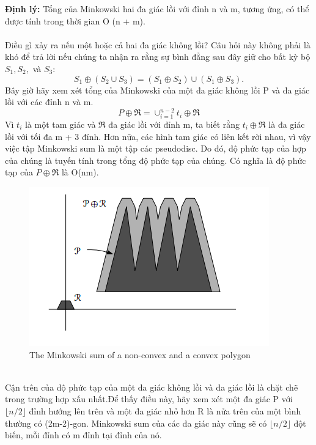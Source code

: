 \documentclass[a4paper,12pt]{report}
\begin{document}
\textbf{Định lý:} Tổng của Minkowski hai đa giác lồi với đỉnh n và m, tương ứng, có thể được tính trong thời gian O (n + m). \\ \\
Điều gì xảy ra nếu một hoặc cả hai đa giác không lồi? Câu hỏi này không phải là khó để trả lời nếu chúng ta nhận ra rằng sự bình đẳng sau đây giữ cho bất kỳ bộ $S_1, S_2,$ và $S_3$:
\begin{displaymath}
S_1 \oplus (S_2 \cup S_3) = (S_1 \oplus S_2) \cup (S_1 \oplus S_3).
\end{displaymath}
Bây giờ hãy xem xét tổng của Minkowski của một đa giác không lồi P và đa giác lồi với các đỉnh n và m.
\begin{displaymath}
P \oplus \Re = \cup_{i = 1}^{n-2}t_i \oplus \Re
\end{displaymath}
Vì $t_i$ là một tam giác và $\Re$ đa giác lồi với đỉnh m, ta biết rằng $t_i \oplus \Re$ là đa giác lồi với tối đa m + 3 đỉnh. Hơn nữa, các hình tam giác có liên kết rời nhau, vì vậy việc tập Minkowski sum là một tập các pseudodisc. Do đó, độ phức tạp của  hợp của chúng là tuyến tính trong tổng độ phức tạp của chúng. Có nghĩa là độ phức tạp của $P \oplus \Re$ là O(nm). \\
\begin{figure}[h]
\begin{center}
\includegraphics[width=0.6\linewidth]{10.png}
\caption{The Minkowski sum of a non-convex
and a convex polygon}
\end{center}
\end{figure}\\
Cận trên của độ phức tạp của một đa giác không lồi và đa giác lồi là chặt chẽ trong trường hợp xấu nhất.Để thấy điều này, hãy xem xét một đa giác P với $\lfloor n/2 \rfloor$ đỉnh hướng lên trên và một đa giác nhỏ hơn R là nửa trên của một bình thường có (2m-2)-gon. Minkowski sum của các đa giác này cũng sẽ có $\lfloor n/2 \rfloor$ đột biến, mỗi đỉnh có m đỉnh tại đỉnh của nó. \\ \\
\end{document}

